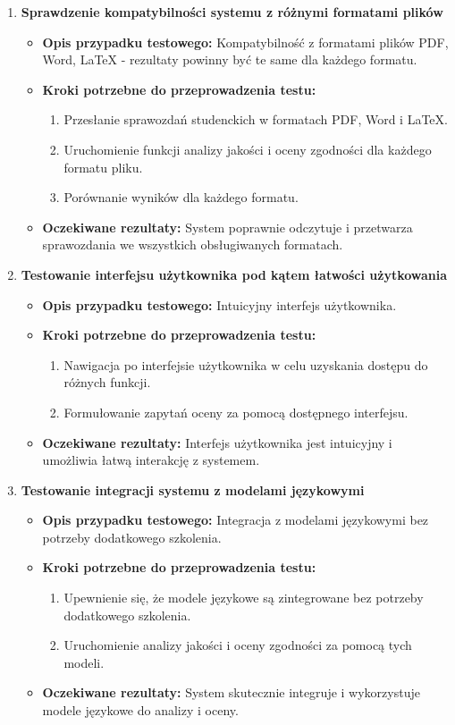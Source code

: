 \documentclass[a4paper, 12pt]{article}
\begin{document}
\begin{enumerate}
\item \textbf{Sprawdzenie kompatybilności systemu z różnymi formatami plików}
   \begin{itemize}
   \item \textbf{Opis przypadku testowego:} Kompatybilność z formatami plików PDF, Word, LaTeX - rezultaty powinny być te same dla każdego formatu.
   \item \textbf{Kroki potrzebne do przeprowadzenia testu:}
     \begin{enumerate}
     \item Przesłanie sprawozdań studenckich w formatach PDF, Word i LaTeX.
     \item Uruchomienie funkcji analizy jakości i oceny zgodności dla każdego formatu pliku.
     \item Porównanie wyników dla każdego formatu.
     \end{enumerate}
   \item \textbf{Oczekiwane rezultaty:} System poprawnie odczytuje i przetwarza sprawozdania we wszystkich obsługiwanych formatach.
   \end{itemize}

    \item \textbf{Testowanie interfejsu użytkownika pod kątem łatwości użytkowania}
   \begin{itemize}
   \item \textbf{Opis przypadku testowego:} Intuicyjny interfejs użytkownika.
   \item \textbf{Kroki potrzebne do przeprowadzenia testu:}
     \begin{enumerate}
     \item Nawigacja po interfejsie użytkownika w celu uzyskania dostępu do różnych funkcji.
     \item Formułowanie zapytań oceny za pomocą dostępnego interfejsu.
     \end{enumerate}
   \item \textbf{Oczekiwane rezultaty:} Interfejs użytkownika jest intuicyjny i umożliwia łatwą interakcję z systemem.
   \end{itemize}

\item \textbf{Testowanie integracji systemu z modelami językowymi}
   \begin{itemize}
   \item \textbf{Opis przypadku testowego:} Integracja z modelami językowymi bez potrzeby dodatkowego szkolenia.
   \item \textbf{Kroki potrzebne do przeprowadzenia testu:}
     \begin{enumerate}
     \item Upewnienie się, że modele językowe są zintegrowane bez potrzeby dodatkowego szkolenia.
     \item Uruchomienie analizy jakości i oceny zgodności za pomocą tych modeli.
     \end{enumerate}
   \item \textbf{Oczekiwane rezultaty:} System skutecznie integruje i wykorzystuje modele językowe do analizy i oceny.
   \end{itemize}

\end{enumerate}
\end{document}
